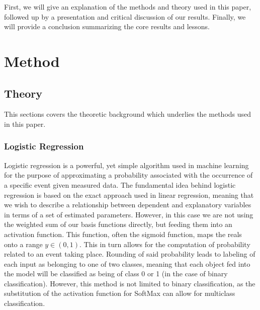 \documentclass[onecolumn,10pt,cleanfoot]{asme2ej}
\begin{document}

First, we will give an explanation of the methods and theory used in this paper, followed up by a presentation and critical discussion of our results. Finally, we will provide a conclusion summarizing the core results and lessons.

\section{Method}

\subsection{Theory}

This sections covers the theoretic background which underlies the methods used in this paper.



\subsubsection{Logistic Regression}

Logistic regression is a powerful, yet simple algorithm used in machine learning for the purpose of approximating a probability associated with the occurrence of a specific event given measured data. The fundamental idea behind logistic regression is based on the exact approach used in linear regression, meaning that we wish to describe a relationship between dependent and explanatory variables in terms of a set of estimated parameters. However, in this case we are not using the weighted sum of our basis functions directly, but feeding them into an activation function. This function, often the sigmoid function, maps the reals onto a range $y \in (0,1)$. This in turn allows for the computation of probability related to an event taking place. Rounding of said probability leads to labeling of each input as belonging to one of two classes, meaning that each object fed into the model will be classified as being of class 0 or 1 (in the case of binary classification). However, this method is not limited to binary classification, as the substitution of the activation function for SoftMax can allow for multiclass classification.
\end{document}
